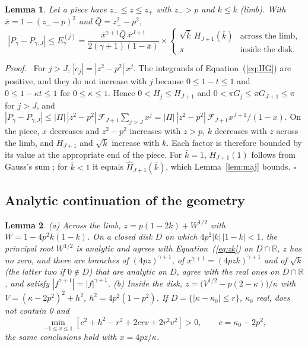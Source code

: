 \documentclass[11pt]{article}
\newtheorem{lemma}{Lemma}
\newenvironment{proof}{\par\noindent\textit{Proof.}\ }{\hfill$\square$\par\medskip}
\begin{document}
\begin{lemma} \label{lem:jrem}
Let a piece have $z_-\le z\le z_+$ with $z_->p$ and $k\le\bar k$ (limb). With $\bar x=1-(z_--p)^2$ and $\bar Q=z_+^2-p^2$,
\begin{equation}
|P_\gamma-P_{\gamma,J}|\le E^{(j)}_\gamma=\frac{\bar x^{\gamma+1}\bar Q\,\bar x^{J+1}}{2(\gamma+1)(1-\bar x)}\times\begin{cases}\sqrt{\bar k}\,H_{J+1}(\bar k)&\text{across the limb,}\\ \pi&\text{inside the disk.}\end{cases} \label{eq:Ej}
\end{equation}
\end{lemma}

\begin{proof}
For $j>J$, $|c_j|=|z^2-p^2|\,x^j$. The integrands of Equation~(\ref{eq:HG}) are positive, and they do not increase with $j$ because $0\le1-t\le1$ and $0\le1-\kappa t\le1$ for $0\le\kappa\le1$. Hence $0<H_j\le H_{J+1}$ and $0<\pi G_j\le\pi G_{J+1}\le\pi$ for $j>J$, and $|P_\gamma-P_{\gamma,J}|\le|\Pi|\,|z^2-p^2|\,\mathcal F_{J+1}\sum_{j>J}x^j=|\Pi|\,|z^2-p^2|\,\mathcal F_{J+1}x^{J+1}/(1-x)$. On the piece, $x$ decreases and $z^2-p^2$ increases with $z>p$, $k$ decreases with $z$ across the limb, and $H_{J+1}$ and $\sqrt k$ increase with $k$. Each factor is therefore bounded by its value at the appropriate end of the piece. For $\bar k=1$, $H_{J+1}(1)$ follows from Gauss's sum \citep[15.4.20]{DLMF}; for $\bar k<1$ it equals $\hat H_{J+1}(\bar k)$, which Lemma~\ref{lem:maj} bounds.
\end{proof}

\subsection{Analytic continuation of the geometry}

\begin{lemma} \label{lem:geom}
(a) Across the limb, $z=p(1-2k)+W^{1/2}$ with $W=1-4p^2k(1-k)$. On a closed disk $D$ on which $4p^2|k|\,|1-k|<1$, the principal root $W^{1/2}$ is analytic and agrees with Equation~(\ref{eq:zk}) on $D\cap\mathbb R$, $z$ has no zero, and there are branches of $(4pz)^{\gamma+1}$, of $x^{\gamma+1}=(4pzk)^{\gamma+1}$ and of $\sqrt k$ (the latter two if $0\notin D$) that are analytic on $D$, agree with the real ones on $D\cap\mathbb R$, and satisfy $|f^{\gamma+1}|=|f|^{\gamma+1}$.
(b) Inside the disk, $z=\bigl(V^{1/2}-p(2-\kappa)\bigr)/\kappa$ with $V=(\kappa-2p^2)^2+h^2$, $h^2=4p^2(1-p^2)$. If $D=\{|\kappa-\kappa_0|\le r\}$, $\kappa_0$ real, does not contain 0 and
\begin{equation}
\min_{-1\le v\le1}\left[c^2+h^2-r^2+2crv+2r^2v^2\right]>0,\qquad c=\kappa_0-2p^2, \label{eq:ReV}
\end{equation}
the same conclusions hold with $x=4pz/\kappa$.
\end{lemma}
\end{document}
